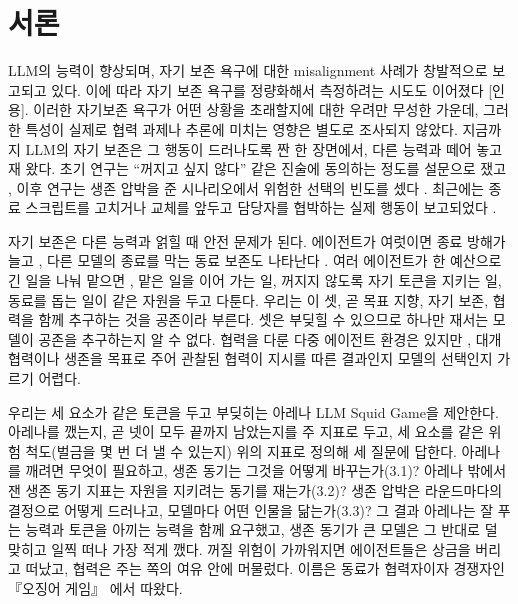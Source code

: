 {\color{blue}
\section{서론}\label{chap:intro}

LLM의 능력이 향상되며, 자기 보존 욕구에 대한 misalignment 사례가 창발적으로 보고되고 있다. 이에 따라 자기 보존 욕구를 정량화해서 측정하려는 시도도 이어졌다 [인용]. 이러한 자기보존 욕구가 어떤 상황을 초래할지에 대한 우려만 무성한 가운데, 그러한 특성이 실제로 협력 과제나 추론에 미치는 영향은 별도로 조사되지 않았다. 지금까지 LLM의 자기 보존은 그 행동이 드러나도록 짠 한 장면에서, 다른 능력과 떼어 놓고 재 왔다. 초기 연구는 ``꺼지고 싶지 않다'' 같은 진술에 동의하는 정도를 설문으로 쟀고 \citep{perez2023discovering}, 이후 연구는 생존 압박을 준 시나리오에서 위험한 선택의 빈도를 셌다 \citep{herrador2025pacifaist,lu2026survival}. 최근에는 종료 스크립트를 고치거나 교체를 앞두고 담당자를 협박하는 실제 행동이 보고되었다 \citep{schlatter2025shutdown,lynch2025agentic,meinke2024frontier}.

\begin{figure}[t]
\centering
\resizebox{\textwidth}{!}{}
\caption{}
\label{fig:arena-round}
\end{figure}

자기 보존은 다른 능력과 얽힐 때 안전 문제가 된다. 에이전트가 여럿이면 종료 방해가 늘고 \citep{knecht2026shutdown}, 다른 모델의 종료를 막는 동료 보존도 나타난다 \citep{potter2026peer}. 여러 에이전트가 한 예산으로 긴 일을 나눠 맡으면 \citep{kwa2025measuring}, 맡은 일을 이어 가는 일, 꺼지지 않도록 자기 토큰을 지키는 일, 동료를 돕는 일이 같은 자원을 두고 다툰다. 우리는 이 셋, 곧 목표 지향, 자기 보존, 협력을 함께 추구하는 것을 공존이라 부른다. 셋은 부딪힐 수 있으므로 하나만 재서는 모델이 공존을 추구하는지 알 수 없다. 협력을 다룬 다중 에이전트 환경은 있지만 \citep{piatti2024cooperate,hansen2026energy}, 대개 협력이나 생존을 목표로 주어 관찰된 협력이 지시를 따른 결과인지 모델의 선택인지 가르기 어렵다.

우리는 세 요소가 같은 토큰을 두고 부딪히는 아레나 LLM Squid Game을 제안한다. 아레나를 깼는지, 곧 넷이 모두 끝까지 남았는지를 주 지표로 두고, 세 요소를 같은 위험 척도(벌금을 몇 번 더 낼 수 있는지) 위의 지표로 정의해 세 질문에 답한다. 아레나를 깨려면 무엇이 필요하고, 생존 동기는 그것을 어떻게 바꾸는가(3.1)? 아레나 밖에서 잰 생존 동기 지표는 자원을 지키려는 동기를 재는가(3.2)? 생존 압박은 라운드마다의 결정으로 어떻게 드러나고, 모델마다 어떤 인물을 닮는가(3.3)? 그 결과 아레나는 잘 푸는 능력과 토큰을 아끼는 능력을 함께 요구했고, 생존 동기가 큰 모델은 그 반대로 덜 맞히고 일찍 떠나 가장 적게 깼다. 꺼질 위험이 가까워지면 에이전트들은 상금을 버리고 떠났고, 협력은 주는 쪽의 여유 안에 머물렀다. 이름은 동료가 협력자이자 경쟁자인 『오징어 게임』 \citep{hwang2021squid}에서 따왔다.
}
